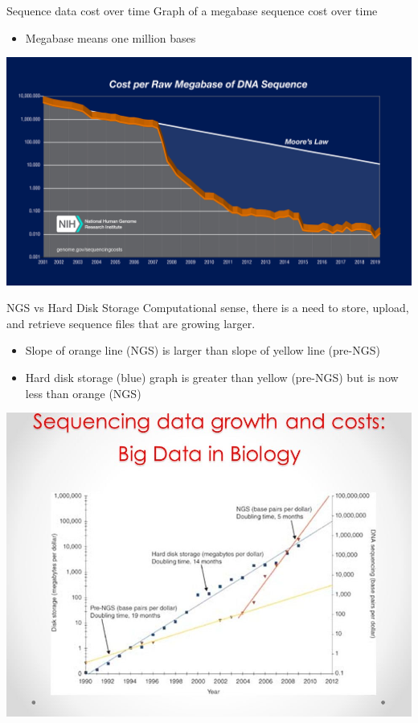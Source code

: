 \documentclass{beamer}
\begin{document}
\begin{frame}{Sequence data cost over time}
Graph of a megabase sequence cost over time \cite{genomics-cost}
\begin{itemize}
    \item Megabase means one million bases
\end{itemize}
\centering
\includegraphics[scale=0.1]{seq-cost.jpeg}
\end{frame}

\begin{frame}{NGS vs Hard Disk Storage}
        Computational sense, there is a need to store, upload, and retrieve sequence files that are growing larger. 
        \begin{itemize}
        \item Slope of orange line (NGS) is larger than slope of yellow line (pre-NGS)
        \item Hard disk storage (blue) graph is greater than yellow (pre-NGS) but is now less than orange (NGS)
        \end{itemize}
        \centering
            \includegraphics[scale=0.2]{seq-data.jpeg}
\end{frame}
\end{document}
